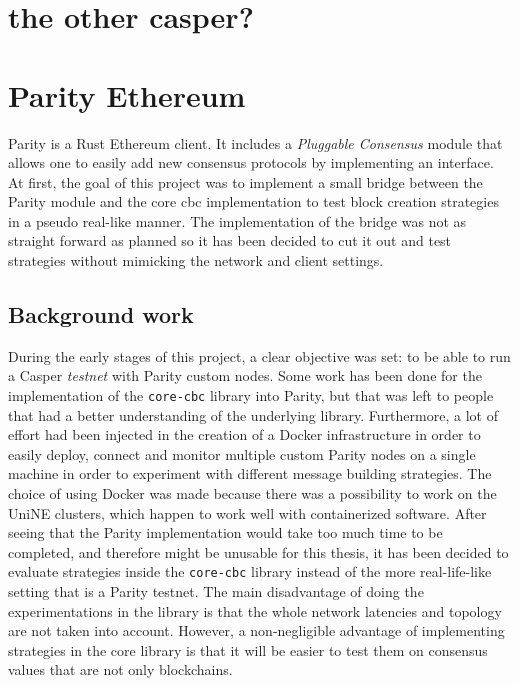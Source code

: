 \section{the other casper?}
\section{Parity Ethereum}
Parity is a Rust Ethereum client. It includes a \textit{Pluggable Consensus}
module that allows one to easily add new consensus protocols by implementing an
interface.  At first, the goal of this project was to implement a small bridge
between the Parity module and the core cbc implementation to test block creation
strategies in a pseudo real-like manner. The implementation of the bridge was
not as straight forward as planned so it has been decided to cut it out and test
strategies without mimicking the network and client settings.

\subsection{Background work}
During the early stages of this project, a clear objective was set: to be able
to run a Casper \textit{testnet} with Parity custom nodes. Some work has been
done for the implementation of the \texttt{core-cbc} library into Parity, but
that was left to people that had a better understanding of the underlying
library. Furthermore,  a lot of effort had been
injected in the creation of a Docker infrastructure in order to easily deploy,
connect and monitor multiple custom Parity nodes on a single machine in order to
experiment with different message building strategies. The choice of using
Docker was made because there was a  possibility to work on the UniNE clusters,
which happen to work well with containerized software. After seeing that the
Parity implementation would take too much time to be completed, and therefore
might be unusable for this thesis, it has been decided to evaluate strategies
inside the \texttt{core-cbc} library instead of the more real-life-like setting
that is a Parity testnet. The main disadvantage of doing the experimentations in
the library is that the whole network latencies and topology are not taken into
account. However, a non-negligible advantage of implementing strategies in the
core library is that it will be easier to test them on consensus values that are
not only blockchains.  

